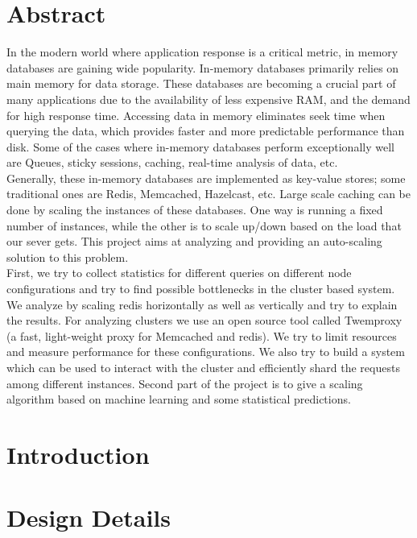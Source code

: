 \documentclass[a4paper]{article}
\begin{document}

\section*{Abstract}
In the modern world where application response is a critical metric,
in memory databases are gaining wide popularity. In-memory databases primarily relies
on main memory for data storage. These databases are becoming a crucial part of many
applications due to the availability of less expensive RAM, and the demand for high response time.
Accessing data in memory eliminates seek time when querying the data,
which provides faster and more predictable performance than disk.
Some of the cases where in-memory databases perform exceptionally well are Queues,
sticky sessions, caching, real-time analysis of data, etc. \\

Generally, these in-memory databases are implemented as key-value stores;
some traditional ones are Redis, Memcached, Hazelcast, etc. Large scale caching
can be done by scaling the instances of these databases. One way is running a fixed number of instances,
while the other is to scale up/down based on the load that our sever gets.
This project aims at analyzing and providing an auto-scaling solution to this problem. \\

First, we try to collect statistics for different queries on different node
configurations and try to find possible bottlenecks in the cluster based system.
We analyze by scaling redis horizontally as well as vertically and try to explain the results.
For analyzing clusters we use an open source tool called Twemproxy
(a fast, light-weight proxy for Memcached and redis). We try to limit resources and
measure performance for these configurations. We also try to build a system which can
be used to interact with the cluster and efficiently shard the requests among
different instances. Second part of the project is to give a scaling algorithm based on machine learning
and some statistical predictions.




\pagebreak
\section*{Introduction}


\pagebreak
\section*{Design Details}
\end{document}
